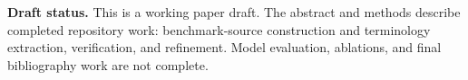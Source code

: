 \maketitle

\noindent\textbf{Draft status.}
This is a working paper draft. The abstract and methods describe completed repository work:
benchmark-source construction and terminology extraction, verification, and refinement. Model
evaluation, ablations, and final bibliography work are not complete.
